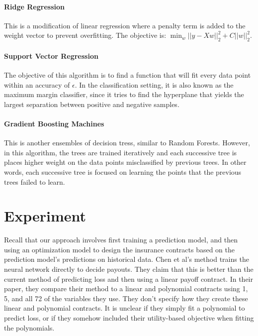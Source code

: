 \documentclass[11pt]{article}
\begin{document}
      \paragraph*{Ridge Regression} This is a modification of linear regression where a penalty term is added to the weight vector to prevent overfitting. The objective is: $\min_w ||y-Xw||^2_2 + C ||w||^2_2$.

      \paragraph*{Support Vector Regression} The objective of this algorithm is to find a function that will fit every data point within an accuracy of $\epsilon$. In the classification setting, it is also known as the maximum margin classifier, since it tries to find the hyperplane that yields the largest separation between positive and negative samples. 

      \paragraph*{Gradient Boosting Machines} This is another ensembles of decision tress, similar to Random Forests. However, in this algorithm, the trees are trained iteratively and each successive tree is places higher weight on the data points misclassified by previous trees. In other words, each successive tree is focused on learning the points that the previous trees failed to learn. 

\section{Experiment}
  Recall that our approach involves first training a prediction model, and then using an optimization model to design the insurance contracts based on the prediction model's predictions on historical data. Chen et al's method trains the neural network directly to decide payouts. They claim that this is better than the current method of predicting loss and then using a linear payoff contract. In their paper, they compare their method to a linear and polynomial contracts using 1, 5, and all 72 of the variables they use. They don't specify how they create these linear and polynomial contracts. It is unclear if they simply fit a polynomial to predict loss, or if they somehow included their utility-based objective when fitting the polynomials.
\end{document}
